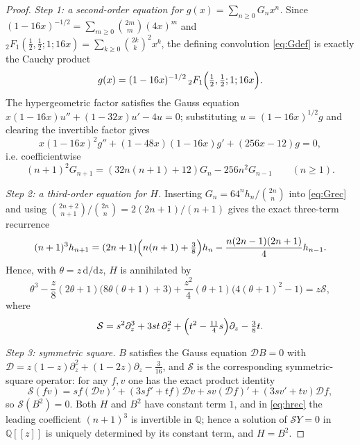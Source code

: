 \documentclass[11pt]{amsart}
\theoremstyle{definition}
\theoremstyle{remark}
\newcommand{\dd}{\mathrm{d}}
\newcommand{\Q}{\mathbb{Q}}
\begin{document}
\begin{proof}
\emph{Step 1: a second-order equation for $g(x)=\sum_{n\ge0}G_nx^n$.}
Since $(1-16x)^{-1/2}=\sum_{m\ge0}\binom{2m}{m}(4x)^m$ and
${}_2F_1(\frac12,\frac12;1;16x)=\sum_{k\ge0}\binom{2k}{k}^2x^k$,
the defining convolution \eqref{eq:Gdef} is exactly the Cauchy product
\begin{equation}\label{eq:cauchy}
g(x)=(1-16x)^{-1/2}\,{}_2F_1\Bigl(\tfrac12,\tfrac12;1;16x\Bigr).
\end{equation}
The hypergeometric factor satisfies the Gauss equation
$x(1-16x)u''+(1-32x)u'-4u=0$; substituting
$u=(1-16x)^{1/2}g$ and clearing the invertible factor gives
\[
x(1-16x)^2g''+(1-48x)(1-16x)g'+(256x-12)g=0,
\]
i.e. coefficientwise
\begin{equation}\label{eq:Grec}
(n+1)^2G_{n+1}=(32n(n+1)+12)G_n-256n^2G_{n-1}\qquad(n\ge1).
\end{equation}

\emph{Step 2: a third-order equation for $H$.}
Inserting $G_n=64^nh_n/\binom{2n}{n}$ into \eqref{eq:Grec} and using
$\binom{2n+2}{n+1}/\binom{2n}{n}=2(2n+1)/(n+1)$ gives the exact
three-term recurrence
\begin{equation}\label{eq:hrec}
(n+1)^3h_{n+1}
=(2n+1)\Bigl(n(n+1)+\tfrac38\Bigr)h_n
-\frac{n(2n-1)(2n+1)}{4}h_{n-1}.
\end{equation}
Hence, with $\theta=z\,\dd/\dd z$, $H$ is annihilated by
\[
\theta^3-\frac z8(2\theta+1)\bigl(8\theta(\theta+1)+3\bigr)
+\frac{z^2}4(\theta+1)\bigl(4(\theta+1)^2-1\bigr)=z\mathcal S,
\]
where
\begin{equation}\label{eq:S}
\mathcal S=s^2\partial_z^3+3st\,\partial_z^2
+\Bigl(t^2-\tfrac{11}{4}s\Bigr)\partial_z-\tfrac38t .
\end{equation}

\emph{Step 3: symmetric square.} $B$ satisfies the Gauss equation
$\mathcal D B=0$ with
$\mathcal D=z(1-z)\partial_z^2+(1-2z)\partial_z-\frac3{16}$, and $\mathcal S$
is the corresponding symmetric-square operator: for any $f,v$ one has
the exact product identity
\begin{equation}\label{eq:symmsq}
\mathcal S(fv)=sf(\mathcal Dv)'+(3sf'+tf)\mathcal Dv
+sv(\mathcal Df)'+(3sv'+tv)\mathcal Df ,
\end{equation}
so $\mathcal S(B^2)=0$. Both $H$ and $B^2$ have constant term $1$, and
in \eqref{eq:hrec} the leading coefficient $(n+1)^3$ is invertible in
$\Q$; hence a solution of $\mathcal SY=0$ in $\Q[[z]]$ is uniquely
determined by its constant term, and $H=B^2$.


\end{proof}
\end{document}
